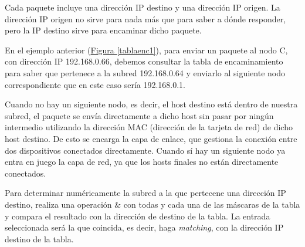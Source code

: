 \documentclass[10pt,a4paper,spanish]{report}
\begin{document}
Cada paquete incluye una dirección IP destino y una dirección IP origen. La dirección IP origen no sirve para nada más que para saber a dónde responder, pero la IP destino sirve para encaminar dicho paquete. 

En el ejemplo anterior (\hyperref[tablaenc1]{Figura \ref*{tablaenc1}}), para enviar un paquete al nodo  C, con dirección IP 192.168.0.66, debemos consultar la tabla de encaminamiento para saber que pertenece a la subred 192.168.0.64 y enviarlo al siguiente nodo correspondiente que en este caso sería 192.168.0.1.

Cuando no hay un siguiente nodo, es decir, el host destino está dentro de nuestra subred, el paquete se envía directamente a dicho host sin pasar por ningún intermedio utilizando la dirección MAC (dirección de la tarjeta de red) de dicho host destino. De esto se encarga la capa de enlace, que gestiona la conexión entre dos dispositivos conectados directamente. Cuando sí hay un siguiente nodo ya entra en juego la capa de red, ya que los hosts finales no están directamente conectados.

Para determinar numéricamente la subred a la que pertecene una dirección IP destino, realiza una operación $\&$ con todas y cada una de las máscaras de la tabla y compara el resultado con la dirección de destino de la tabla. La entrada seleccionada será la que coincida, es decir, haga \textit{\textcolor{tema4}{matching}}, con la dirección IP destino de la tabla.
\end{document}
